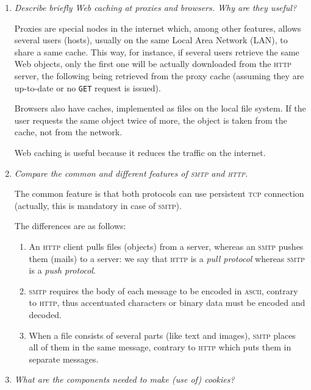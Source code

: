 \documentclass[11pt,a4paper]{article}
\begin{document}
\begin{enumerate}
  \item \emph{Describe briefly Web caching at proxies and
    browsers. Why are they useful?}

  Proxies are special nodes in the internet which, among other
  features, allows several users (hosts), usually on the same Local
  Area Network (LAN), to share a same cache. This way, for instance,
  if several users retrieve the same Web objects, only the first one
  will be actually downloaded from the \textsc{http} server, the
  following being retrieved from the proxy cache (assuming they are
  up-to-date or no \texttt{GET} request is issued).

  Browsers also have caches, implemented as files on the local file
  system. If the user requests the same object twice of more, the
  object is taken from the cache, not from the network.

  Web caching is useful because it reduces the traffic on the internet.

  \item \emph{Compare the common and different features of
    \textsc{smtp} and \textsc{http}.}

  The common feature is that both protocols can use persistent
  \textsc{tcp} connection (actually, this is mandatory in case of
  \textsc{smtp}).

  The differences are as follows:
  \begin{enumerate}

    \item An \textsc{http} client pulls files (objects) from a server,
    whereas an \textsc{smtp} pushes them (mails) to a server: we say
    that \textsc{http} is a \emph{pull protocol} whereas
    \textsc{smtp} is a \emph{push protocol}.

    \item \textsc{smtp} requires the body of each message to be encoded
    in \textsc{ascii}, contrary to \textsc{http}, thus accentuated
    characters or binary data must be encoded and decoded.

    \item When a file consists of several parts (like text and images),
    \textsc{smtp} places all of them in the same message, contrary to
    \textsc{http} which puts them in separate messages.

  \end{enumerate}

  \item \emph{What are the components needed to make (use of) cookies?}


\end{enumerate}
\end{document}
